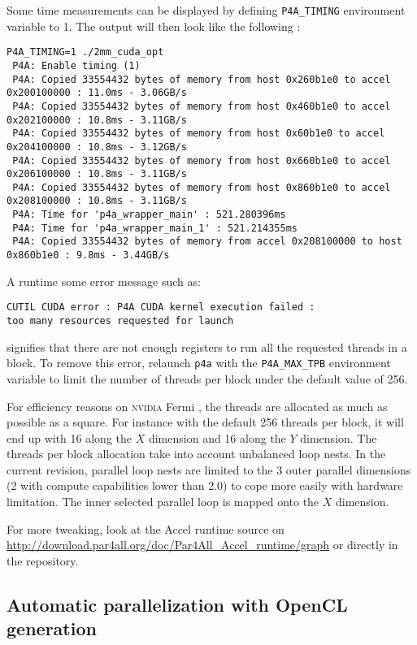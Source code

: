 \documentclass[a4paper]{article}
\begin{document}
Some time measurements can be displayed by defining
\verb|P4A_TIMING| environment variable to 1. The output will then look like the
following : {\scriptsize
\begin{verbatim}
P4A_TIMING=1 ./2mm_cuda_opt
 P4A: Enable timing (1)
 P4A: Copied 33554432 bytes of memory from host 0x260b1e0 to accel 0x200100000 : 11.0ms - 3.06GB/s
 P4A: Copied 33554432 bytes of memory from host 0x460b1e0 to accel 0x202100000 : 10.8ms - 3.11GB/s
 P4A: Copied 33554432 bytes of memory from host 0x60b1e0 to accel 0x204100000 : 10.8ms - 3.12GB/s
 P4A: Copied 33554432 bytes of memory from host 0x660b1e0 to accel 0x206100000 : 10.8ms - 3.11GB/s
 P4A: Copied 33554432 bytes of memory from host 0x860b1e0 to accel 0x208100000 : 10.8ms - 3.11GB/s
 P4A: Time for 'p4a_wrapper_main' : 521.280396ms
 P4A: Time for 'p4a_wrapper_main_1' : 521.214355ms
 P4A: Copied 33554432 bytes of memory from accel 0x208100000 to host 0x860b1e0 : 9.8ms - 3.44GB/s
\end{verbatim}
}


A runtime some error message such as:
\begin{verbatim}
CUTIL CUDA error : P4A CUDA kernel execution failed :
too many resources requested for launch
\end{verbatim}
signifies that there are not enough registers to run all the requested
threads in a block. To remove this error,
relaunch \texttt{p4a} with the \verb|P4A_MAX_TPB| environment variable to limit the
number of threads per block under the default value of 256.

For efficiency reasons on \textsc{nvidia} Fermi \Agpu, the threads are
allocated as much as possible as a square. For instance with the default 256 
threads per block, it will end up with 16 along the $X$ dimension and 16 along
the $Y$ dimension. The threads per block allocation take into account unbalanced 
loop nests. In the current revision, parallel loop nests are limited to the 3 
outer parallel dimensions (2 with compute capabilities lower than 2.0) to cope 
more easily with \Acuda \Agpu hardware limitation. The inner selected parallel 
loop is mapped onto the $X$ \Agpu dimension.

For more tweaking, look at the \Apfa Accel runtime source on
\url{http://download.par4all.org/doc/Par4All_Accel_runtime/graph} or
directly in the \Agit repository.

\subsection{Automatic parallelization with OpenCL generation}
\label{sec:autom-parall-with-OpenCL}
\end{document}
